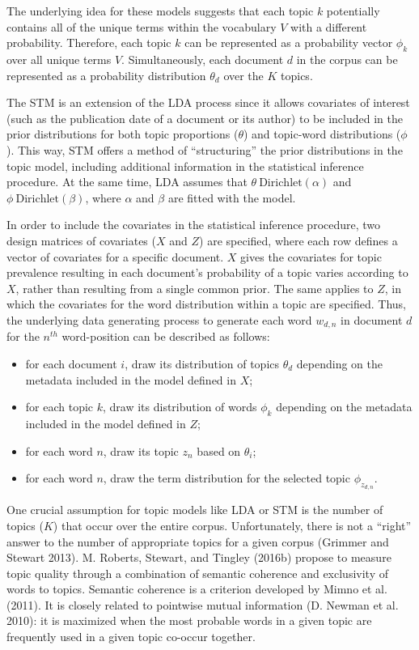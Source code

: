 \documentclass[
  12pt,
]{article}
\providecommand{\tightlist}{%
  \setlength{\itemsep}{0pt}\setlength{\parskip}{0pt}}
\begin{document}
The underlying idea for these models suggests that each topic \(k\)
potentially contains all of the unique terms within the vocabulary \(V\)
with a different probability. Therefore, each topic \(k\) can be
represented as a probability vector \(\phi_k\) over all unique terms
\(V\). Simultaneously, each document \(d\) in the corpus can be
represented as a probability distribution \(\theta_d\) over the \(K\)
topics.

The STM is an extension of the LDA process since it allows covariates of
interest (such as the publication date of a document or its author) to
be included in the prior distributions for both topic proportions
(\(\theta\)) and topic-word distributions (\(\phi\)). This way, STM
offers a method of ``structuring'' the prior distributions in the topic
model, including additional information in the statistical inference
procedure. At the same time, LDA assumes that
\(\theta ~ \text{Dirichlet}(\alpha)\) and
\(\phi ~ \text{Dirichlet}(\beta)\), where \(\alpha\) and \(\beta\) are
fitted with the model.

In order to include the covariates in the statistical inference
procedure, two design matrices of covariates (\(X\) and \(Z\)) are
specified, where each row defines a vector of covariates for a specific
document. \(X\) gives the covariates for topic prevalence resulting in
each document's probability of a topic varies according to \(X\), rather
than resulting from a single common prior. The same applies to \(Z\), in
which the covariates for the word distribution within a topic are
specified. Thus, the underlying data generating process to generate each
word \(w_{d,n}\) in document \(d\) for the \(n^{th}\) word-position can
be described as follows:

\begin{itemize}
\tightlist
\item
  for each document \(i\), draw its distribution of topics \(\theta_d\)
  depending on the metadata included in the model defined in \(X\);
\item
  for each topic \(k\), draw its distribution of words \(\phi_k\)
  depending on the metadata included in the model defined in \(Z\);
\item
  for each word \(n\), draw its topic \(z_n\) based on \(\theta_i\);
\item
  for each word \(n\), draw the term distribution for the selected topic
  \(\phi_{z_{d,n}}\).
\end{itemize}

One crucial assumption for topic models like LDA or STM is the number of
topics (\(K\)) that occur over the entire corpus. Unfortunately, there
is not a ``right'' answer to the number of appropriate topics for a
given corpus (Grimmer and Stewart 2013). M. Roberts, Stewart, and
Tingley (2016b) propose to measure topic quality through a combination
of semantic coherence and exclusivity of words to topics. Semantic
coherence is a criterion developed by Mimno et al. (2011). It is closely
related to pointwise mutual information (D. Newman et al. 2010): it is
maximized when the most probable words in a given topic are frequently
used in a given topic co-occur together.
\end{document}
